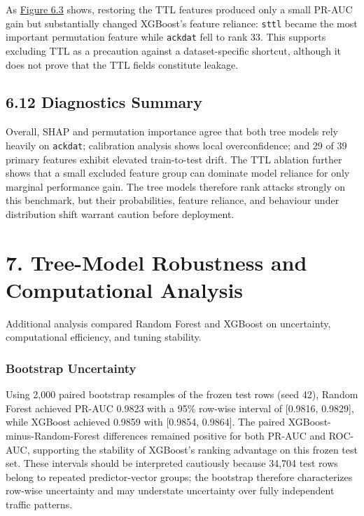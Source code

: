 \documentclass[
  canadian,
  12pt,
]{article}
\let\reportOrigSection\section
\renewcommand{\section}{\par\Needspace*{10\baselineskip}\reportOrigSection}%
\let\reportOrigSubsection\subsection
\renewcommand{\subsection}{\par\Needspace*{8\baselineskip}\reportOrigSubsection}%
\let\reportOrigSubsubsection\subsubsection
\renewcommand{\subsubsection}{\par\Needspace*{5\baselineskip}\reportOrigSubsubsection}%
\begin{document}
As \hyperref[fig-6-3]{Figure 6.3} shows, restoring the TTL features
produced only a small PR-AUC gain but substantially changed XGBoost's
feature reliance: \texttt{sttl} became the most important permutation
feature while \texttt{ackdat} fell to rank 33. This supports excluding
TTL as a precaution against a dataset-specific shortcut, although it
does not prove that the TTL fields constitute leakage.

\subsection[\texorpdfstring{\numberline{6.12}Diagnostics Summary}{6.12 Diagnostics Summary}]{6.12 Diagnostics Summary}\label{sec-6-12}

Overall, SHAP and permutation importance agree that both tree models
rely heavily on \texttt{ackdat}; calibration analysis shows local
overconfidence; and 29 of 39 primary features exhibit elevated
train-to-test drift. The TTL ablation further shows that a small
excluded feature group can dominate model reliance for only marginal
performance gain. The tree models therefore rank attacks strongly on
this benchmark, but their probabilities, feature reliance, and behaviour
under distribution shift warrant caution before deployment.

\section[\texorpdfstring{\numberline{7.}Tree-Model Robustness and Computational
Analysis}{7. Tree-Model Robustness and Computational
Analysis}]{7. Tree-Model Robustness and Computational
Analysis}\label{sec-7}

Additional analysis compared Random Forest and XGBoost on uncertainty,
computational efficiency, and tuning stability.

\subsubsection{Bootstrap Uncertainty}\label{bootstrap-uncertainty}

Using 2,000 paired bootstrap resamples of the frozen test rows (seed
42), Random Forest achieved PR-AUC 0.9823 with a 95\% row-wise interval
of {[}0.9816, 0.9829{]}, while XGBoost achieved 0.9859 with {[}0.9854,
0.9864{]}. The paired XGBoost-minus-Random-Forest differences remained
positive for both PR-AUC and ROC-AUC, supporting the stability of
XGBoost's ranking advantage on this frozen test set. These intervals
should be interpreted cautiously because 34,704 test rows belong to
repeated predictor-vector groups; the bootstrap therefore characterizes
row-wise uncertainty and may understate uncertainty over fully
independent traffic patterns.
\end{document}

